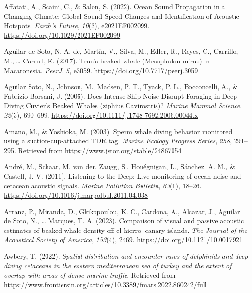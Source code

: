 \documentclass[
]{article}
\newlength{\cslhangindent}
\newlength{\cslentryspacingunit} %
\newenvironment{CSLReferences}[2] %
 {%
  \setlength{\parindent}{0pt}
  \ifodd #1
  \let\oldpar\par
  \def\par{\hangindent=\cslhangindent\oldpar}
  \fi
  \setlength{\parskip}{#2\cslentryspacingunit}
 }%
 {}
\begin{document}
\hypertarget{refs}{}
\begin{CSLReferences}{1}{0}
\leavevmode{}%
Affatati, A., Scaini, C., \& Salon, S. (2022). Ocean Sound Propagation
in a Changing Climate: Global Sound Speed Changes and Identification of
Acoustic Hotspots. \emph{Earth's Future}, \emph{10}(3), e2021EF002099.
\url{https://doi.org/10.1029/2021EF002099}

\leavevmode{}%
Aguilar de Soto, N. A. de, Martín, V., Silva, M., Edler, R., Reyes, C.,
Carrillo, M., \ldots{} Carroll, E. (2017). True{'}s beaked whale
(Mesoplodon mirus) in Macaronesia. \emph{PeerJ}, \emph{5}, e3059.
\url{https://doi.org/10.7717/peerj.3059}

\leavevmode{}%
Aguilar Soto, N., Johnson, M., Madsen, P. T., Tyack, P. L., Bocconcelli,
A., \& Fabrizio Borsani, J. (2006). Does Intense Ship Noise Disrupt
Foraging in Deep-Diving Cuvier's Beaked Whales (ziphius Cavirostris)?
\emph{Marine Mammal Science}, \emph{22}(3), 690--699.
\url{https://doi.org/10.1111/j.1748-7692.2006.00044.x}

\leavevmode{}%
Amano, M., \& Yoshioka, M. (2003). Sperm whale diving behavior monitored
using a suction-cup-attached TDR tag. \emph{Marine Ecology Progress
Series}, \emph{258}, 291--295. Retrieved from
\url{https://www.jstor.org/stable/24867054}

\leavevmode{}%
André, M., Schaar, M. van der, Zaugg, S., Houégnigan, L., Sánchez, A.
M., \& Castell, J. V. (2011). Listening to the Deep: Live monitoring of
ocean noise and cetacean acoustic signals. \emph{Marine Pollution
Bulletin}, \emph{63}(1), 18--26.
\url{https://doi.org/10.1016/j.marpolbul.2011.04.038}

\leavevmode{}%
Arranz, P., Miranda, D., Gkikopoulou, K. C., Cardona, A., Alcazar, J.,
Aguilar de Soto, N., \ldots{} Marques, T. A. (2023). Comparison of
visual and passive acoustic estimates of beaked whale density off el
hierro, canary islands. \emph{The Journal of the Acoustical Society of
America}, \emph{153}(4), 2469. \url{https://doi.org/10.1121/10.0017921}

\leavevmode{}%
Awbery, T. (2022). \emph{Spatial distribution and encounter rates of
delphinids and deep diving cetaceans in the eastern mediterranean sea of
turkey and the extent of overlap with areas of dense marine traffic}.
Retrieved from
\url{https://www.frontiersin.org/articles/10.3389/fmars.2022.860242/full}


\end{CSLReferences}
\end{document}
